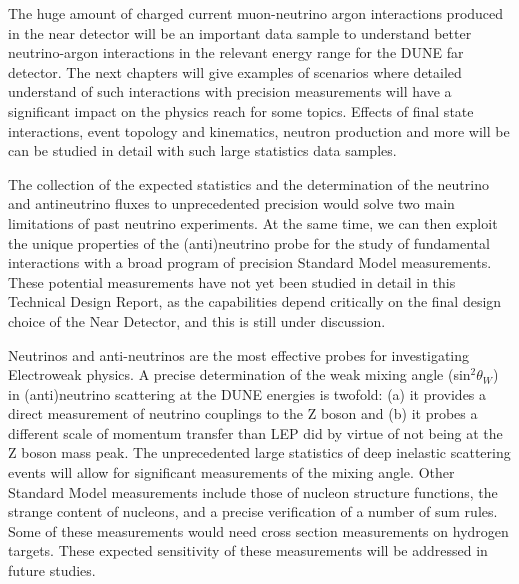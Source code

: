The huge amount of charged current muon-neutrino argon interactions produced in 
the near detector will be an important data sample to understand better neutrino-argon 
interactions in the relevant energy range for the DUNE far detector. The next chapters
will give examples of scenarios where detailed understand of such interactions with 
precision measurements will have a significant impact on the physics reach for some
topics. Effects of final state interactions, event topology and kinematics, neutron production and more will be can be studied in detail with such large statistics 
data samples.

The collection of the expected statistics and the determination of the neutrino and
antineutrino fluxes to unprecedented precision would solve  two main limitations of past neutrino experiments. At the same time, we can then exploit the unique
properties of the (anti)neutrino probe for the study of fundamental interactions with a broad program of precision Standard Model measurements. These potential measurements
have not yet been studied in detail in this Technical Design Report, as the capabilities
depend critically on the final design choice of the Near Detector, and this is still under discussion.

Neutrinos and anti-neutrinos are the most effective probes for investigating Electroweak 
physics. A precise determination of the weak mixing angle (sin$^2\theta_W$) in (anti)neutrino
scattering at the DUNE energies is twofold: (a) it provides a direct measurement of neutrino
couplings to the Z boson and (b) it probes a different scale of momentum transfer than LEP
did by virtue of not being at the Z boson mass peak. The unprecedented large statistics
of deep inelastic scattering events will allow for significant measurements of the mixing 
angle. Other Standard Model measurements include those of nucleon structure functions, the strange content of nucleons, and a precise verification of a number of sum rules. 
Some of these measurements would need cross section measurements 
on hydrogen targets.  These expected sensitivity of these measurements will be addressed
in future studies.


